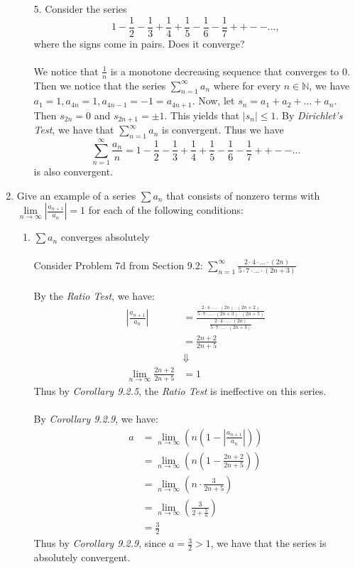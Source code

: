 \documentclass[12pt,letterpaper]{article}
\newcommand{\limx}[2]{\displaystyle\lim\limits_{#1 \to #2}}
\newcommand{\abs}[1]{\left\lvert #1 \right\rvert}
\newcommand{\N}{\mathbb{N}}
\theoremstyle{case}
\theoremstyle{definition}
\begin{document}
\begin{enumerate}
\begin{enumerate}
			\item[5.] Consider the series
			\[1-\frac{1}{2}-\frac{1}{3}+\frac{1}{4}+\frac{1}{5}-\frac{1}{6}-\frac{1}{7}++--\dots,\]
			where the signs come in pairs. Does it converge?
			\\\\We notice that $\frac{1}{n}$ is a monotone decreasing sequence that converges to 0. Then we notice that the series $\displaystyle\sum_{n=1}^{\infty} a_n$ where for every $n \in \N$, we have $a_1=1, a_{4n}=1, a_{4n-1}=-1=a_{4n+1}$. Now, let $s_n=a_1+a_2+\dots+a_n$. Then $s_{2n}=0$ and $s_{2n+1}=\pm 1$. This yields that $|s_n| \leq 1$. By \textit{Dirichlet's Test}, we have that $\displaystyle\sum_{n=1}^{\infty} a_n$ is convergent. Thus we have
			\[\sum_{n=1}^{\infty} \frac{a_n}{n}=1-\frac{1}{2}-\frac{1}{3}+\frac{1}{4}+\frac{1}{5}-\frac{1}{6}-\frac{1}{7}++--\dots\]
			is also convergent.
		\end{enumerate}
	
		\item Give an example of a series $\sum a_n$ that consists of nonzero terms with $\limx{n}{\infty} \abs{\frac{a_{n+1}}{a_n}}=1$ for each of the following conditions:
		\begin{enumerate}
			\item $\sum a_n$ converges absolutely
			\\\\Consider Problem 7d from Section 9.2: $\displaystyle\sum_{n=1}^{\infty}\frac{2\cdot4\cdot\dots\cdot(2n)}{5\cdot7\cdot\dots\cdot(2n+3)}$
			\\\\By the \textit{Ratio Test}, we have:
			\begin{align*}
			\abs{\frac{a_{n+1}}{a_n}} &= \frac{\displaystyle\frac{2 \cdot 4 \cdot \dots \cdot (2n)\cdot (2n+2)}{5 \cdot 7 \cdot \dots \cdot (2n+3) \cdot (2n+5)}}{\displaystyle\frac{2 \cdot 4 \cdot \dots \cdot (2n)}{5 \cdot 7 \cdot \dots \cdot (2n+3)}} \\
			&= \frac{2n+2}{2n+5} \\
			&\Downarrow \\
			\limx{n}{\infty} \frac{2n+2}{2n+5} &= 1
			\end{align*}
			Thus by \textit{Corollary 9.2.5}, the \textit{Ratio Test} is ineffective on this series.
			\\\\By \textit{Corollary 9.2.9}, we have:
			\begin{align*}
			a &= \limx{n}{\infty} \left(n \left(1-\abs{\frac{a_{n+1}}{a_n}}\right)\right) \\
			&= \limx{n}{\infty} \left(n \left(1-\frac{2n+2}{2n+5}\right)\right) \\
			&= \limx{n}{\infty} \left(n \cdot \frac{3}{2n+5}\right) \\
			&= \limx{n}{\infty} \left(\frac{3}{2+\frac{5}{n}}\right) \\
			&= \frac{3}{2}
			\end{align*}
			Thus by \textit{Corollary 9.2.9}, since $a=\frac{3}{2} > 1$, we have that the series is absolutely convergent.\\
			

\end{enumerate}
\end{enumerate}
\end{document}
